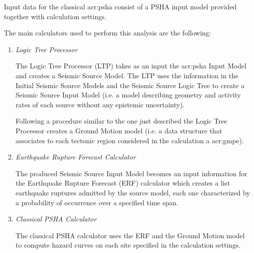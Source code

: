 Input data for the classical \gls{acr:psha} consist of a PSHA input model
provided together with calculation settings.

The main calculators used to perform this analysis are the following:

\begin{enumerate}

	\item \emph{Logic Tree Processor}

	The Logic Tree Processor (LTP) takes as an input the \gls{acr:psha} Input
	Model and creates a Seismic Source Model. The LTP uses the information in
	the Initial Seismic Source Models and the Seismic Source Logic Tree to
	create a Seismic Source Input Model (i.e. a model describing geometry and
	activity rates of each source without any epistemic uncertainty).

	Following a procedure similar to the one just described the Logic Tree
	Processor creates a Ground Motion model (i.e. a data structure that
	associates to each tectonic region considered in the calculation a
	\gls{acr:gmpe}).

	\item \emph{Earthquake Rupture Forecast Calculator}

	The produced Seismic Source Input Model becomes an input information for
	the Earthquake Rupture Forecast (ERF) calculator which creates a list
	earthquake ruptures admitted by the source model, each one characterized
	by a probability of occurrence over a specified time span.

	\item \emph{Classical PSHA Calculator}

	The classical PSHA calculator uses the ERF and the Ground Motion model to
	compute hazard curves on each site specified in the calculation settings.

\end{enumerate}